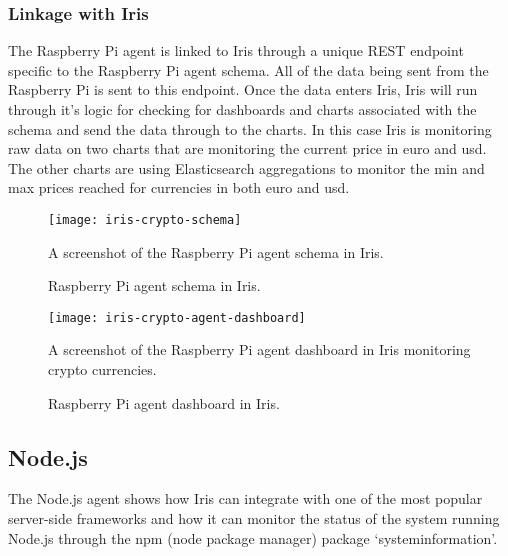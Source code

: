 \documentclass[12pt,a4paper,titlepage]{report}
\begin{document}
\subsubsection{Linkage with Iris}
The Raspberry Pi agent is linked to Iris through a unique REST endpoint specific to the Raspberry Pi agent schema. All of the data being sent from the Raspberry Pi is sent to this endpoint. Once the data enters Iris, Iris will run through it's logic for checking for dashboards and charts associated with the schema and send the data through to the charts. 
In this case Iris is monitoring raw data on two charts that are monitoring the current price in euro and usd. The other charts are using Elasticsearch aggregations to monitor the min and max prices reached for currencies in both euro and usd.

\begin{figure}[H]
\begin{tcolorbox}
\begin{center}
\texttt{[image: iris-crypto-schema]}
\end{center}
A screenshot of the Raspberry Pi agent schema in Iris.
\end{tcolorbox}
\caption{Raspberry Pi agent schema in Iris.}
\end{figure}

\begin{figure}[H]
\begin{tcolorbox}
\begin{center}
\texttt{[image: iris-crypto-agent-dashboard]}
\end{center}
A screenshot of the Raspberry Pi agent dashboard in Iris monitoring crypto currencies.
\end{tcolorbox}
\caption{Raspberry Pi agent dashboard in Iris.}
\end{figure}

\subsection{Node.js}
The Node.js agent shows how Iris can integrate with one of the most popular server-side frameworks and how it can monitor the status of the system running Node.js through the npm (node package manager) package `systeminformation'.
\end{document}
